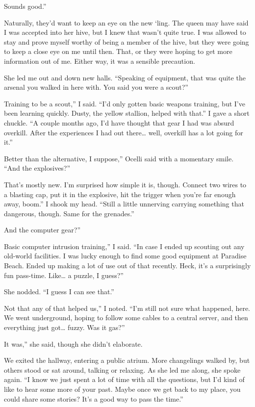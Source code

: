 \leavevmode{}Sounds good.”

Naturally, they’d want to keep an eye on the new ‘ling. The queen may have said I was accepted into her hive, but I knew that wasn’t quite true. I was allowed to stay and prove myself worthy of being a member of the hive, but they were going to keep a close eye on me until then. That, or they were hoping to get more information out of me. Either way, it was a sensible precaution.

She led me out and down new halls. “Speaking of equipment, that was quite the arsenal you walked in here with. You said you were a scout?”

\leavevmode{}Training to be a scout,” I said. “I’d only gotten basic weapons training, but I’ve been learning quickly. Dusty, the yellow stallion, helped with that.” I gave a short chuckle. “A couple months ago, I’d have thought that gear I had was absurd overkill. After the experiences I had out there… well, overkill has a lot going for it.”

\leavevmode{}Better than the alternative, I suppose,” Ocelli said with a momentary smile. “And the explosives?”

\leavevmode{}That’s mostly new. I’m surprised how simple it is, though. Connect two wires to a blasting cap, put it in the explosive, hit the trigger when you’re far enough away, boom.” I shook my head. “Still a little unnerving carrying something that dangerous, though. Same for the grenades.”

\leavevmode{}And the computer gear?”

\leavevmode{}Basic computer intrusion training,” I said. “In case I ended up scouting out any old-world facilities. I was lucky enough to find some good equipment at Paradise Beach. Ended up making a lot of use out of that recently. Heck, it’s a surprisingly fun pass-time. Like… a puzzle, I guess?”

She nodded. “I guess I can see that.”

\leavevmode{}Not that any of that helped us,” I noted. “I’m still not sure what happened, here. We went underground, hoping to follow some cables to a central server, and then everything just got… fuzzy. Was it gas?”

\leavevmode{}It was,” she said, though she didn’t elaborate.

We exited the hallway, entering a public atrium. More changelings walked by, but others stood or sat around, talking or relaxing. As she led me along, she spoke again. “I know we just spent a lot of time with all the questions, but I’d kind of like to hear some more of your past. Maybe once we get back to my place, you could share some stories? It’s a good way to pass the time.”

